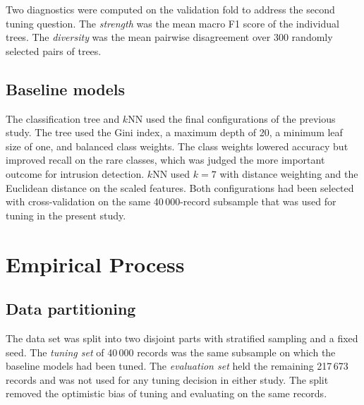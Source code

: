 \documentclass[conference,10pt]{IEEEtran}
\begin{document}
Two diagnostics were computed on the validation fold to address the second tuning question. The \emph{strength} was the mean macro F1 score of the individual trees. The \emph{diversity} was the mean pairwise disagreement over 300 randomly selected pairs of trees.

\subsection{Baseline models}
The classification tree and $k$NN used the final configurations of the previous study. The tree used the Gini index, a maximum depth of 20, a minimum leaf size of one, and balanced class weights. The class weights lowered accuracy but improved recall on the rare classes, which was judged the more important outcome for intrusion detection. $k$NN used $k=7$ with distance weighting and the Euclidean distance on the scaled features. Both configurations had been selected with cross-validation on the same 40\,000-record subsample that was used for tuning in the present study.

\section{Empirical Process}\label{sec:emp}

\subsection{Data partitioning}
The data set was split into two disjoint parts with stratified sampling and a fixed seed. The \emph{tuning set} of 40\,000 records was the same subsample on which the baseline models had been tuned. The \emph{evaluation set} held the remaining 217\,673 records and was not used for any tuning decision in either study. The split removed the optimistic bias of tuning and evaluating on the same records.
\end{document}
